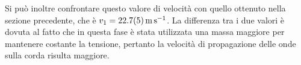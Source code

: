 Si può inoltre confrontare questo valore di velocità con quello ottenuto nella sezione precedente, che è $v_1 = \qty{22.7 \pm 0.5}{\meter\per\second}$. La differenza tra i due valori è dovuta al fatto che in questa fase è stata utilizzata una massa maggiore per mantenere costante la tensione, pertanto la velocità di propagazione delle onde sulla corda risulta maggiore.